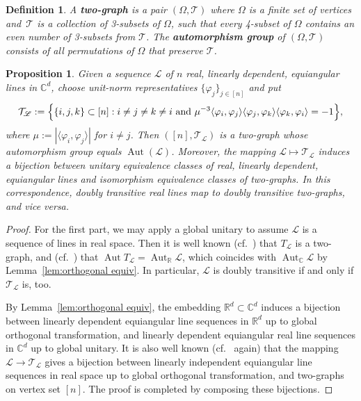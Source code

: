 \documentclass[11pt]{article}
\newtheorem{proposition}[theo]{Proposition}
\newtheorem{definition}[theo]{Definition}
\theoremstyle{definition}
\numberwithin{equation}{section}
\begin{document}
\begin{definition}
A \textbf{two-graph} is a pair $(\Omega, \mathcal{T})$ where $\Omega$ is a finite set of vertices and~$\mathcal{T}$ is a collection of 3-subsets of $\Omega$, such that every 4-subset of $\Omega$ contains an even number of 3-subsets from $\mathcal{T}$.
The \textbf{automorphism group} of $(\Omega,\mathcal{T})$ consists of all permutations of $\Omega$ that preserve $\mathcal{T}$.
\end{definition}

\begin{proposition}
\label{prop:real lines are two-graphs}
Given a sequence $\mathscr{L}$ of $n$ real, linearly dependent, equiangular lines in $\mathbb{C}^d$, choose unit-norm representatives $\{ \varphi_j \}_{j\in [n]}$ and put
\[ \mathcal{T}_{\mathscr{L}} := \Bigl\{ \{ i,j,k\} \subset [n] : i \neq j \neq k \neq i \text{ and } \mu^{-3} \langle \varphi_i, \varphi_j \rangle \langle \varphi_j, \varphi_k \rangle \langle \varphi_k, \varphi_i \rangle = -1 \Bigr\}, \]
where $\mu := | \langle \varphi_i, \varphi_j \rangle |$ for $i \neq j$.
Then $([n], \mathcal{T}_{\mathscr{L}})$ is a two-graph whose automorphism group equals $\operatorname{Aut}(\mathscr{L})$.
Moreover, the mapping $\mathscr{L} \mapsto \mathcal{T}_{\mathscr{L}}$ induces a bijection between unitary equivalence classes of real, linearly dependent, equiangular lines and isomorphism equivalence classes of two-graphs.
In this correspondence, doubly transitive real lines map to doubly transitive two-graphs, and vice versa.
\end{proposition}

\begin{proof}
For the first part, we may apply a global unitary to assume $\mathscr{L}$ is a sequence of lines in real space.
Then it is well known (cf.\ \cite{Seidel:91}) that $T_{\mathscr{L}}$ is a two-graph, and (cf.\ \cite{Cameron:77}) that $\operatorname{Aut} T_{\mathscr{L}} = \operatorname{Aut}_{\mathbb{R}} \mathscr{L}$, which coincides with $\operatorname{Aut}_{\mathbb{C}} \mathscr{L}$ by Lemma~\ref{lem:orthogonal equiv}.
In particular, $\mathscr{L}$ is doubly transitive if and only if $\mathcal{T}_{\mathscr{L}}$ is, too.

By Lemma~\ref{lem:orthogonal equiv}, the embedding $\mathbb{R}^d \subset \mathbb{C}^d$ induces a bijection between linearly dependent equiangular line sequences in $\mathbb{R}^d$ up to global orthogonal transformation, and linearly dependent equiangular real line sequences in $\mathbb{C}^d$ up to global unitary.
It is also well known (cf.\ \cite{Seidel:91} again) that the mapping $\mathscr{L} \to \mathcal{T}_{\mathscr{L}}$ gives a bijection between linearly independent equiangular line sequences in real space up to global orthogonal transformation, and two-graphs on vertex set $[n]$.
The proof is completed by composing these bijections.
\end{proof}
\end{document}
